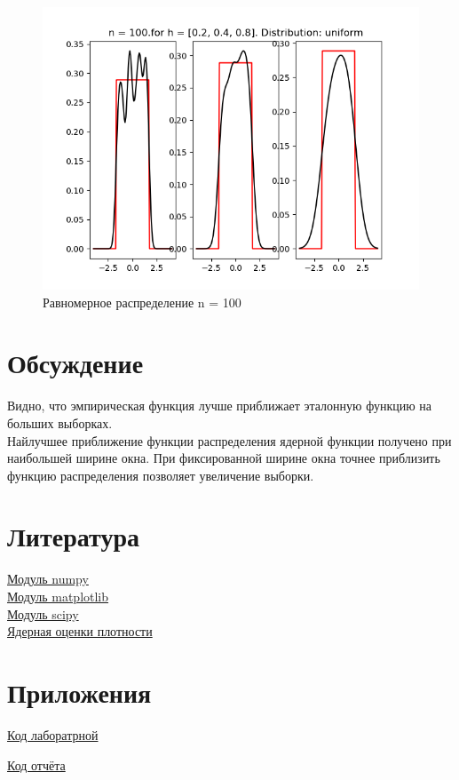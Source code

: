 \documentclass[a4]{article}
\begin{document}
\begin{center}
\begin{figure}[h!]
			\includegraphics[width=\textwidth]{uniformker100.png}
			\caption[Равномерное распределение n = 100]{Равномерное распределение n = 100}
		\end{figure}
		
	\end{center}
		
	\newpage
	\section{Обсуждение}
		Видно, что эмпирическая функция лучше приближает эталонную функцию на больших выборках.\\
		Найлучшее приближение функции распределения ядерной функции получено при наибольшей ширине окна. При фиксированной ширине окна точнее приблизить функцию распределения позволяет увеличение выборки.
	
	\section{Литература}
	
	\href{https://physics.susu.ru/vorontsov/language/numpy.html}{Модуль numpy}\\
	
	\href{https://matplotlib.org/}{Модуль matplotlib}\\
	
	\href{https://www.scipy.org/}{Модуль scipy}\\
	
	\href{https://ru.wikipedia.org/wiki/%D0%AF%D0%B4%D0%B5%D1%80%D0%BD%D0%B0%D1%8F_%D0%BE%D1%86%D0%B5%D0%BD%D0%BA%D0%B0_%D0%BF%D0%BB%D0%BE%D1%82%D0%BD%D0%BE%D1%81%D1%82%D0%B8}{Ядерная оценки плотности}\\
	
	\section{Приложения}
	
	\href{https://github.com/LuciusGen/Matstat/blob/master/Lab4/Lab4.py}{Код лаборатрной}
	
	\href{https://github.com/LuciusGen/Matstat/blob/master/Lab4/lab4.tex}{Код отчёта}
	
\end{document}
